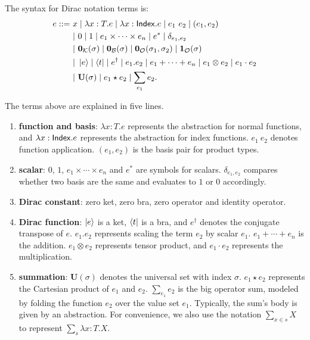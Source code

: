 \begin{definition}
    The syntax for Dirac notation terms is:
    \begin{align*}
        e ::=\ & x \mid \lambda x : T.e \mid \lambda x : \mathsf{Index}.e \mid e_1\ e_2 \mid (e_1, e_2) \\
        & |\ 0 \mid 1 \mid e_1 \times \cdots \times e_n \mid e^* \mid \delta_{e_1, e_2} \\
        & |\ \mathbf{0}_\mathcal{K}(\sigma) \mid \mathbf{0}_\mathcal{B}(\sigma) \mid \mathbf{0}_\mathcal{O}(\sigma_1, \sigma_2) \mid \mathbf{1}_\mathcal{O}(\sigma) \\
        & |\ \ket{e} \mid \bra{t} \mid e^\dagger \mid e_1.e_2 \mid e_1 + \cdots + e_n \mid e_1 \otimes e_2 \mid e_1 \cdot e_2 \\
        & |\ \mathbf{U}(\sigma) \mid e_1 \star e_2 \mid \sum_{e_1} e_2.
    \end{align*}
\end{definition}
The terms above are explained in five lines.
\begin{enumerate}
    \item \textbf{function and basis}: \( \lambda x : T.e \) represents the abstraction for normal functions, and \( \lambda x : \mathsf{Index}.e \) represents the abstraction for index functions.
    \( e_1\ e_2 \) denotes function application.
    \( (e_1, e_2) \) is the basis pair for product types.
    \item \textbf{scalar}: \( 0 \), \( 1 \), \( e_1 \times \cdots \times e_n \) and \( e^* \) are symbols for scalars.
    \( \delta_{e_1, e_2} \) compares whether two basis are the same and evaluates to $1$ or $0$ accordingly.
    \item \textbf{Dirac constant}: zero ket, zero bra, zero operator and identity operator.
    \item \textbf{Dirac function}: \( \ket{e} \) is a ket, \( \bra{t} \) is a bra, and \( e^\dagger \) denotes the conjugate transpose of \( e \). \( e_1.e_2 \) represents scaling the term \( e_2 \) by scalar \( e_1 \). \(e_1 + \cdots + e_n\) is the addition. \( e_1 \otimes e_2 \) represents tensor product, and \( e_1 \cdot e_2 \) represents the multiplication.
    \item \textbf{summation}: \( \mathbf{U}(\sigma) \) denotes the universal set with index \( \sigma \). \( e_1 \star e_2 \) represents the Cartesian product of \( e_1 \) and \( e_2 \). \( \sum_{e_1} e_2 \) is the big operator sum, modeled by folding the function \( e_2 \) over the value set \( e_1 \). Typically, the sum's body is given by an abstraction. For convenience, we also use the notation \( \sum_{x \in s} X \) to represent \( \sum_{s} \lambda x : T . X \).
\end{enumerate}


